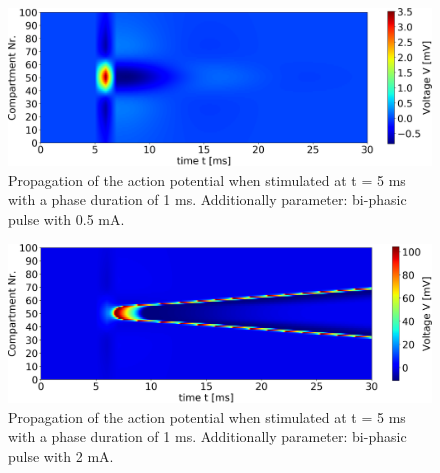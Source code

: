 \documentclass{scrartcl}			%
\begin{document}
\begin{figure}[hbpt!]					%
	\begin{flushleft}
		\hspace*{-0.3in}
		\includegraphics[scale=0.47]{3_3.png}
		\captionsetup{width=\linewidth}  %
		\caption{ Propagation of the action potential when stimulated at t = 5 ms with a phase duration of 1 ms. Additionally parameter: bi-phasic pulse with 0.5 mA.}		
		\label{fig33} %
	\end{flushleft}
\end{figure}
\begin{figure}[hbpt!]					%
	\begin{flushleft}
		\hspace*{-0.3in}
		\includegraphics[scale=0.47]{3_4.png}
		\captionsetup{width=\linewidth}  %
		\caption{Propagation of the action potential when stimulated at t = 5 ms with a phase duration of 1 ms. Additionally parameter: bi-phasic pulse with 2 mA.}		
		\label{fig34} %
	\end{flushleft}
\end{figure}
\end{document}
